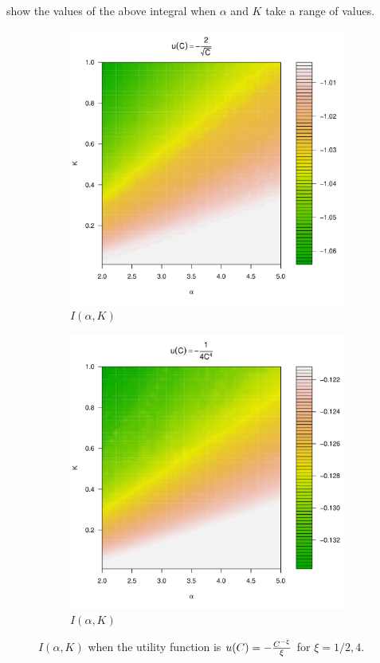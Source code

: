 \documentclass{article}
\begin{document}
show the values of the above integral when $\alpha$ and $K$ take
a range of values.
\begin{figure}[htb!]
  \begin{subfigure}[b]{0.5\linewidth}
    \includegraphics[width=\textwidth]{preference_pareto5e-1.pdf}
    \caption{$I(\alpha, K)$}
    \label{fig:preference_pareto5e-1}
  \end{subfigure}
  \begin{subfigure}[b]{0.5\linewidth}
    \includegraphics[width=\textwidth]{preference_pareto4.pdf}
    \caption{$I(\alpha, K)$}
    \label{fig:preference_pareto4}
  \end{subfigure}
  \caption{$I(\alpha, K)$ when the utility function is
    $u(C) = -{C^{-\xi} \over \xi}$ for $\xi = 1/2, 4$.
  }
\end{figure}
\end{document}
